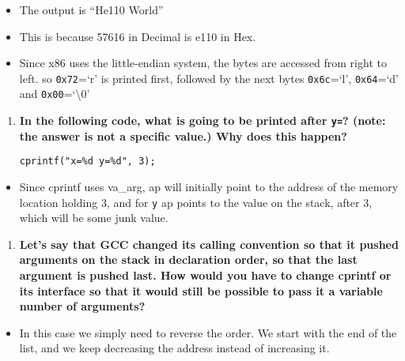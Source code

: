 \documentclass[]{article}
\begin{document}
\begin{itemize}
\itemsep1pt\parskip0pt
\item
  The output is ``He110 World''
\item
  This is because 57616 in Decimal is e110 in Hex.
\item
  Since x86 uses the little-endian system, the bytes are accessed from
  right to left. so \texttt{0x72}=`r' is printed first, followed by the
  next bytes \texttt{0x6c}=`l', \texttt{0x64}=`d' and
  \texttt{0x00}=`\textbackslash{}0'
\end{itemize}

\begin{enumerate}
\def\labelenumi{\arabic{enumi}.}
\setcounter{enumi}{4}
\item
  \textbf{In the following code, what is going to be printed after
  \texttt{y=}? (note: the answer is not a specific value.) Why does this
  happen?}

\begin{verbatim}
cprintf("x=%d y=%d", 3);
\end{verbatim}
\end{enumerate}

\begin{itemize}
\itemsep1pt\parskip0pt
\item
  Since cprintf uses va\_arg, ap will initially point to the address of
  the memory location holding 3, and for \texttt{y} ap points to the
  value on the stack, after 3, which will be some junk value.
\end{itemize}

\begin{enumerate}
\def\labelenumi{\arabic{enumi}.}
\setcounter{enumi}{5}
\itemsep1pt\parskip0pt
\item
  \textbf{Let's say that GCC changed its calling convention so that it
  pushed arguments on the stack in declaration order, so that the last
  argument is pushed last. How would you have to change cprintf or its
  interface so that it would still be possible to pass it a variable
  number of arguments?}
\end{enumerate}

\begin{itemize}
\itemsep1pt\parskip0pt
\item
  In this case we simply need to reverse the order. We start with the
  end of the list, and we keep decreasing the address instead of
  increasing it.
\end{itemize}
\end{document}
